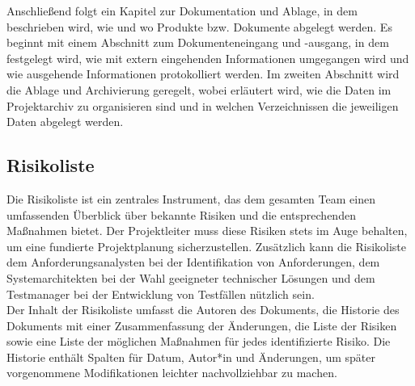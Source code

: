 

Anschließend folgt ein Kapitel zur Dokumentation und Ablage, in dem beschrieben wird, wie und wo Produkte bzw. 
Dokumente abgelegt werden. Es beginnt mit einem Abschnitt zum Dokumenteneingang und -ausgang, in dem festgelegt 
wird, wie mit extern eingehenden Informationen umgegangen wird und wie ausgehende Informationen protokolliert 
werden. Im zweiten Abschnitt wird die Ablage und Archivierung geregelt, wobei erläutert wird, wie die Daten im 
Projektarchiv zu organisieren sind und in welchen Verzeichnissen die jeweiligen Daten abgelegt werden.



\subsection{Risikoliste}  \label{Risikoliste}

Die Risikoliste ist ein zentrales Instrument, das dem gesamten Team einen umfassenden Überblick über bekannte Risiken 
und die entsprechenden Maßnahmen bietet. Der Projektleiter muss diese Risiken stets im Auge behalten, um eine 
fundierte Projektplanung sicherzustellen. Zusätzlich kann die Risikoliste dem Anforderungsanalysten bei der 
Identifikation von Anforderungen, dem Systemarchitekten bei der Wahl geeigneter technischer Lösungen und dem 
Testmanager bei der Entwicklung von Testfällen nützlich sein.\\

Der Inhalt der Risikoliste umfasst die Autoren des Dokuments, die Historie des Dokuments mit einer Zusammenfassung 
der Änderungen, die Liste der Risiken sowie eine Liste der möglichen Maßnahmen für jedes identifizierte Risiko. 
Die Historie enthält Spalten für Datum, Autor*in und Änderungen, um später vorgenommene Modifikationen leichter 
nachvollziehbar zu machen.\\


